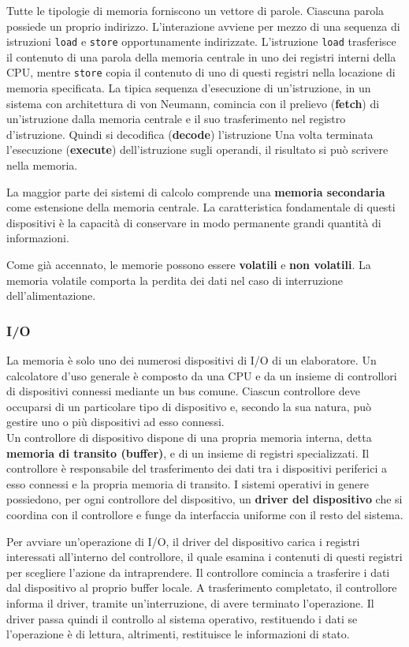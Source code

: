 \documentclass[11pt,a4paper]{article}
\begin{document}
Tutte le tipologie di memoria forniscono un vettore di parole. Ciascuna parola
possie­de un proprio indirizzo. L'interazione avviene per mezzo di una sequenza di istruzioni \texttt{load}
e \texttt{store} opportunamente indirizzate. L'istruzione \texttt{load} trasferisce il contenuto di una pa­rola della memoria centrale in uno dei registri interni della CPU, mentre \texttt{store} copia il
con­tenuto di uno di questi registri nella locazione di memoria specificata.
La tipica sequenza d'esecuzione di un'istruzione, in un sistema con architettura di von
Neumann, comincia con il prelievo (\textbf{fetch}) di un'istruzione dalla memoria centrale e il suo
trasferimento nel registro d'istruzione. Quindi si decodifica (\textbf{decode}) l'istruzione
Una vol­ta terminata l'esecuzione (\textbf{execute}) dell'istruzione sugli operandi, il risultato si può scrivere nella memo­ria.

La maggior parte dei sistemi di calcolo comprende una \textbf{memoria secon­daria} come estensione della memoria centrale. La caratteristica fondamentale di questi di­spositivi è la capacità di conservare in modo permanente grandi quantità di informazioni.

Come già accennato, le memorie possono essere \textbf{volatili} e \textbf{non volatili}. La memoria volatile comporta la perdita dei dati nel caso di interruzione dell'alimentazione.

\subsubsection{I/O}
La memoria è solo uno dei numerosi dispositivi di I/O di un elaboratore. Un calcolatore d'uso generale è composto da una CPU e da un insieme di controllori di
dispositivi connessi mediante un bus comune. Ciascun controllore deve occuparsi di un
particolare tipo di dispositivo e, secondo la sua natura, può gestire uno o più dispositivi ad
es­so connessi.\\
Un controllore di dispositivo dispone di una propria me­moria interna, detta \textbf{memoria di transito (buffer)}, e di un insieme di registri specializzati. Il
controllore è responsabile del trasferimento dei dati tra i dispositivi periferici a esso connes­si e la propria memoria di transito. I sistemi operativi in genere possiedono, per ogni controllore del dispositivo, un \textbf{driver del dispositivo} che si coordina con il controllore e funge
da interfaccia uniforme con il resto del sistema.

Per avviare un'operazione di I/O, il driver del dispositivo carica i registri interessati all'interno del controllore, il quale esamina i contenuti di questi registri per
scegliere l'azione da intraprendere. Il controllore comincia a trasferire i dati dal dispositivo al proprio buffer locale. A trasferimento
completato, il controllore informa il driver, tramite un'interruzione, di avere terminato l'o­perazione. Il driver passa quindi il controllo al sistema operativo, restituendo i dati se l'operazione è di lettura, altrimenti, restituisce le informazioni di stato.
\end{document}
